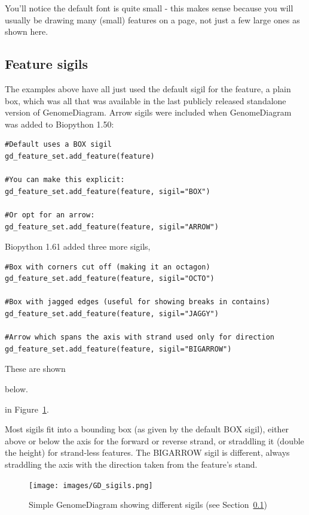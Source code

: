 \documentclass{report}
\begin{document}
You'll notice the default font is quite small - this makes sense because
you will usually be drawing many (small) features on a page, not just a
few large ones as shown here.

\subsection{Feature sigils}
\label{sec:gd_sigils}

The examples above have all just used the default sigil for the feature, a
plain box, which was all that was available in the last publicly released standalone version of GenomeDiagram. Arrow sigils were included when
GenomeDiagram was added to Biopython 1.50:

\begin{verbatim}
#Default uses a BOX sigil
gd_feature_set.add_feature(feature)

#You can make this explicit:
gd_feature_set.add_feature(feature, sigil="BOX")

#Or opt for an arrow:
gd_feature_set.add_feature(feature, sigil="ARROW")
\end{verbatim}

\noindent
Biopython 1.61 added three more sigils,

\begin{verbatim}
#Box with corners cut off (making it an octagon)
gd_feature_set.add_feature(feature, sigil="OCTO")

#Box with jagged edges (useful for showing breaks in contains)
gd_feature_set.add_feature(feature, sigil="JAGGY")

#Arrow which spans the axis with strand used only for direction
gd_feature_set.add_feature(feature, sigil="BIGARROW")
\end{verbatim}

These are shown
\begin{htmlonly}
below.
\end{htmlonly}
\begin{latexonly}in Figure~\ref{fig:gd_sigils}.
\end{latexonly}
Most sigils fit into a bounding box (as given by the default BOX sigil),
either above or below the axis for the forward or reverse strand, or
straddling it (double the height) for strand-less features.
The BIGARROW sigil is different, always straddling the axis with the
direction taken from the feature's stand.

\begin{htmlonly}
\end{htmlonly}
\begin{latexonly}
\begin{figure}[htbp]
\centering
\texttt{[image: images/GD\_sigils.png]}
\caption{Simple GenomeDiagram showing different sigils
(see Section~\ref{sec:gd_sigils})}
\label{fig:gd_sigils}
\end{figure}
\end{latexonly}
\end{document}
